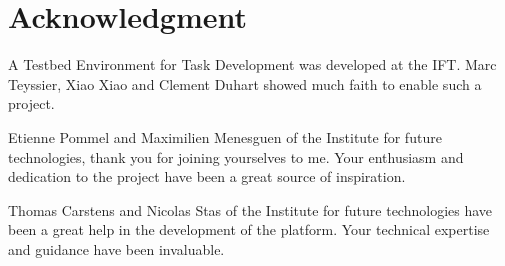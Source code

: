 \pagebreak

\section*{Acknowledgment}
A Testbed Environment for Task Development was developed at
the IFT. Marc Teyssier, Xiao Xiao and Clement Duhart showed
much faith to enable such a project.

Etienne Pommel and Maximilien Menesguen of the Institute for future technologies, thank you
for joining yourselves to me. Your enthusiasm and dedication to the project have been a great source of inspiration.

Thomas Carstens and Nicolas Stas of the Institute for future technologies have been a great help in the development of the platform. Your technical expertise and guidance have been invaluable.

